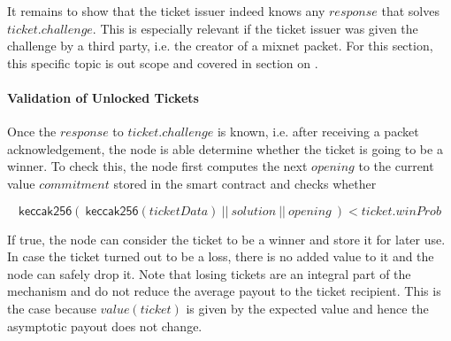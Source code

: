 It remains to show that the ticket issuer indeed knows any $response$ that solves $ticket.challenge$. This is especially relevant if the ticket issuer was given the challenge by a third party, i.e. the creator of a mixnet packet. For this section, this specific topic is out scope and covered in section on .

\paragraph{Validation of Unlocked Tickets}
\label{sec:tickets:validation:unlocked}

Once the $response$ to $ticket.challenge$ is known, i.e. after receiving a packet acknowledgement, the node is able determine whether the ticket is going to be a winner. To check this, the node first computes the next $opening$ to the current value $commitment$ stored in the smart contract and checks whether

$$ \mathsf{keccak256} ( \ \mathsf{keccak256}(ticketData) \ || \ solution \ || \ opening \ ) < ticket.winProb $$

If true, the node can consider the ticket to be a winner and store it for later use. In case the ticket turned out to be a loss, there is no added value to it and the node can safely drop it. Note that losing tickets are an integral part of the mechanism and do not reduce the average payout to the ticket recipient. This is the case because $value(ticket)$ is given by the expected value and hence the asymptotic payout does not change.